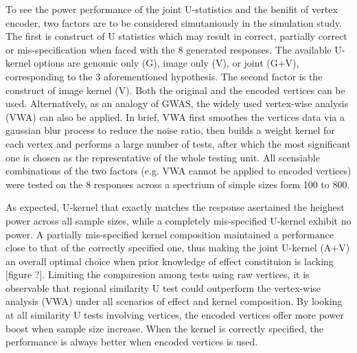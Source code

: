 \documentclass[twocolumn]{article}
\begin{document}
To see the power performance of the joint U-statistics and the benifit of vertex encoder, two factors are to be considered simutaniously in the simulation study. The first is construct of U statistics which may result in correct, partially correct or mis-specification when faced with the 8 generated responses. The available U-kernel options are genomic only (G), image only (V), or joint (G+V), corresponding to the 3 aforementioned hypothesis. The second factor is the construct of image kernel (V). Both the original and the encoded vertices can be used. Alternatively, as an analogy of GWAS, the widely used vertex-wise analysis (VWA) can also be applied. In brief, VWA first smoothes the vertices data via a gaussian blur process to reduce the noise ratio, then builds a weight kernel for each vertex and performs a large number of tests, after which the most significant one is chosen as the representative of the whole testing unit. All scensiable combinations of the two factors (e.g. VWA cannot be applied to encoded vertices) were tested on the 8 responses across a spectrium of simple sizes form 100 to 800.

As expected, U-kernel that exactly matches the response asertained the heighest power across all sample sizes, while a completely mis-specified U-kernel exhibit no power. A partially mis-specified kernel composition maintained a performance close to that of the correctly specified one, thus making the joint U-kernel (A+V) an overall optimal choice when prior knowledge of effect constituion is lacking [figure ?]. Limiting the comparesion among tests using raw vertices, it is observable that regional similarity U test could outperform the vertex-wise analysis (VWA) under all scenarios of effect and kernel composition. By looking at all similarity U tests involving vertices, the encoded vertices offer more power boost when sample size increase. When the kernel is correctly specified, the performance is always better when encoded vertices is used.

\end{document}
